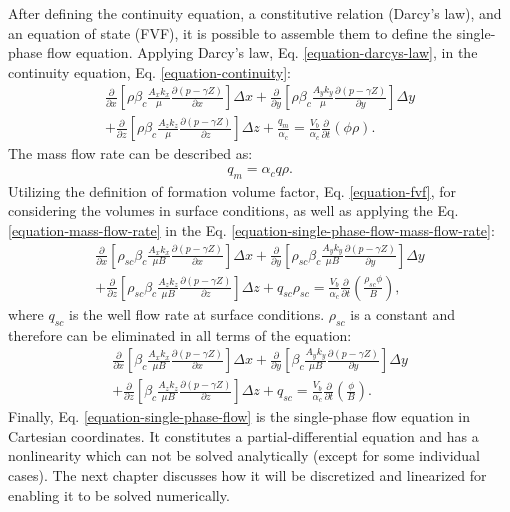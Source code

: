 After defining the continuity equation, a constitutive relation (Darcy's law), and an equation of state (FVF), it is possible to assemble them to define the single-phase flow equation.
%
Applying Darcy's law, Eq. \ref{equation-darcys-law}, in the continuity equation, Eq. \ref{equation-continuity}:
%
\begin{multline}
	\label{equation-single-phase-flow-mass-flow-rate}
	\frac{\partial}{\partial x}\left[ \rho \beta_c \frac{A_x k_x}{\mu}\frac{\partial (p - \gamma Z)}{\partial x}\right] \Delta x +
	\frac{\partial}{\partial y}\left[ \rho \beta_c \frac{A_y k_y}{\mu}\frac{\partial (p - \gamma Z)}{\partial y}\right] \Delta y \\ +
	\frac{\partial}{\partial z}\left[ \rho \beta_c \frac{A_z k_z}{\mu}\frac{\partial (p - \gamma Z)}{\partial z}\right] \Delta z +
	\frac{q_m}{\alpha_c}= \frac {V_b}{\alpha_c}\frac{\partial}{\partial t}\left( \phi \rho\right) .
\end{multline}
%
The mass flow rate can be described as:
%
\begin{align}
	\label{equation-mass-flow-rate}
	q_m=\alpha_c q \rho.
\end{align}
%
Utilizing the definition of formation volume factor, Eq. \ref{equation-fvf}, for considering the volumes in surface conditions, as well as applying the Eq. \ref{equation-mass-flow-rate} in the Eq. \ref{equation-single-phase-flow-mass-flow-rate}:
%
\begin{multline}
	\label{equation-single-phase-flow-rho_sc}
	\frac{\partial}{\partial x}\left[ \rho_{sc}\beta_c \frac{A_x k_x}{\mu B}\frac{\partial (p - \gamma Z)}{\partial x}\right] \Delta x +
	\frac{\partial}{\partial y}\left[ \rho_{sc}\beta_c \frac{A_y k_y}{\mu B}\frac{\partial (p - \gamma Z)}{\partial y}\right] \Delta y \\ +
	\frac{\partial}{\partial z}\left[ \rho_{sc}\beta_c \frac{A_z k_z}{\mu B}\frac{\partial (p - \gamma Z)}{\partial z}\right] \Delta z +
	q_{sc}\rho_{sc}= \frac {V_b}{\alpha_c}\frac{\partial}{\partial t}\left( \frac{\rho_{sc}\phi}{B}\right) ,
\end{multline}
%
where $q_{sc}$ is the well flow rate at surface conditions. $\rho_{sc}$ is a constant and therefore can be eliminated in all terms of the equation:
%
\begin{multline}
	\label{equation-single-phase-flow}
	\frac{\partial}{\partial x}\left[ \beta_c \frac{A_x k_x}{\mu B}\frac{\partial (p - \gamma Z)}{\partial x}\right] \Delta x +
	\frac{\partial}{\partial y}\left[ \beta_c \frac{A_y k_y}{\mu B}\frac{\partial (p - \gamma Z)}{\partial y}\right] \Delta y \\ +
	\frac{\partial}{\partial z}\left[ \beta_c \frac{A_z k_z}{\mu B}\frac{\partial (p - \gamma Z)}{\partial z}\right] \Delta z +
	q_{sc}= \frac {V_b}{\alpha_c}\frac{\partial}{\partial t}\left( \frac{\phi}{B}\right).
\end{multline}
%
Finally, Eq. \ref{equation-single-phase-flow} is the single-phase flow equation in Cartesian coordinates.
%
It constitutes a partial-differential equation and has a nonlinearity which can not be solved analytically (except for some individual cases).
%
The next chapter discusses how it will be discretized and linearized for enabling it to be solved numerically.
